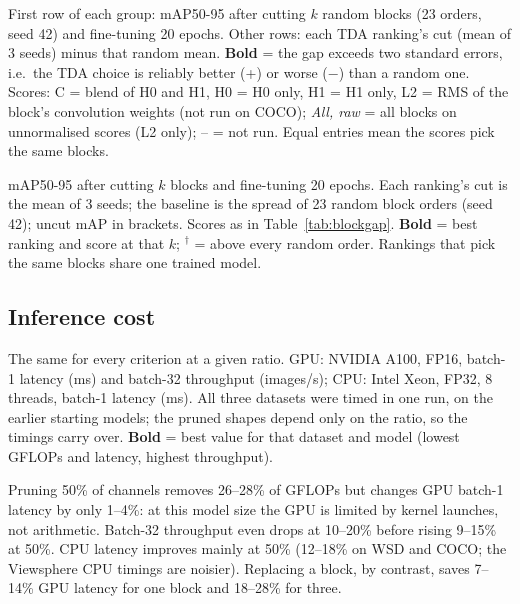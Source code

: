 \documentclass[10pt]{article}
\newcommand{\tnote}[1]{\par\vspace{3pt}\begin{minipage}{\linewidth}\footnotesize #1\end{minipage}}  %
\newcommand{\tbl}[1]{\adjustbox{max width=\linewidth}{}}
\begin{document}
\begin{table}[H]
\centering\small
\caption{Block pruning: TDA-chosen blocks vs randomly chosen blocks}
\label{tab:blockgap}
\tbl{block_gap}
\tnote{First row of each group: mAP50-95 after cutting $k$ random blocks (23 orders, seed 42) and
fine-tuning 20 epochs. Other rows: each TDA ranking's cut (mean of 3 seeds) minus that random mean.
\textbf{Bold} = the gap exceeds two standard errors, i.e.\ the TDA choice is reliably better (+) or
worse ($-$) than a random one. Scores: C = blend of H0 and H1, H0 = H0 only, H1 = H1 only, L2 = RMS
of the block's convolution weights (not run on COCO); \emph{All, raw} = all blocks on unnormalised
scores (L2 only); -- = not run. Equal entries mean the scores pick the same blocks.}
\end{table}

\begin{table}[H]
\centering\small
\caption{Block pruning: accuracy of each ranking's cut}
\label{tab:blocks}
\tbl{blocks}
\tnote{mAP50-95 after cutting $k$ blocks and fine-tuning 20 epochs. Each ranking's cut is the mean of
3 seeds; the baseline is the spread of 23 random block orders (seed 42); uncut mAP in brackets.
Scores as in Table~\ref{tab:blockgap}. \textbf{Bold} = best ranking and score at that $k$;
$^\dagger$ = above every random order. Rankings that pick the same blocks share one trained model.}
\end{table}

\subsection{Inference cost}

\begin{table}[H]
\centering\small
\caption{Size and inference time of channel-pruned models}
\label{tab:cost}
\tbl{cost}
\tnote{The same for every criterion at a given ratio. GPU: NVIDIA A100, FP16, batch-1 latency (ms)
and batch-32 throughput (images/s); CPU: Intel Xeon, FP32, 8 threads, batch-1 latency (ms). All
three datasets were timed in one run, on the earlier starting models; the pruned shapes depend only
on the ratio, so the timings carry over. \textbf{Bold} = best value for that dataset and model (lowest
GFLOPs and latency, highest throughput).}
\end{table}

Pruning 50\% of channels removes 26--28\% of GFLOPs but changes GPU batch-1 latency by only 1--4\%:
at this model size the GPU is limited by kernel launches, not arithmetic. Batch-32 throughput even
drops at 10--20\% before rising 9--15\% at 50\%. CPU latency improves mainly at 50\% (12--18\%
on WSD and COCO; the Viewsphere CPU timings are noisier). Replacing a block, by contrast, saves
7--14\% GPU latency for one block and 18--28\% for three.
\end{document}

